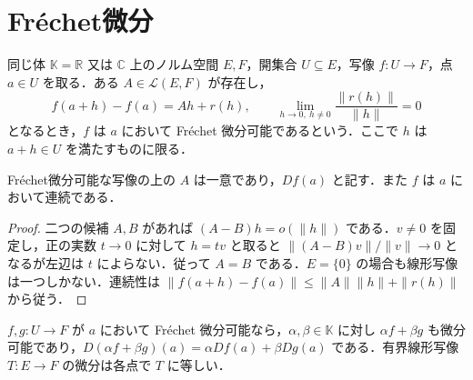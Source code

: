 \section{Fréchet微分}
\begin{defn}[Fréchet微分]
同じ体 $\mathbb K=\mathbb R$ 又は $\mathbb C$ 上のノルム空間 $E,F$，開集合 $U\subseteq E$，写像 $f:U\to F$，点 $a\in U$ を取る．ある $A\in\mathcal L(E,F)$ が存在し，
\[
 f(a+h)-f(a)=Ah+r(h),\qquad \lim_{h\to0,\ h\ne0}\frac{\|r(h)\|}{\|h\|}=0
\]
となるとき，$f$ は $a$ において Fréchet 微分可能であるという．ここで $h$ は $a+h\in U$ を満たすものに限る．
\end{defn}
\begin{prop}[微分の一意性と連続性]
Fréchet微分可能な写像の上の $A$ は一意であり，$Df(a)$ と記す．また $f$ は $a$ において連続である．
\end{prop}
\begin{proof}
二つの候補 $A,B$ があれば $(A-B)h=o(\|h\|)$ である．$v\ne0$ を固定し，正の実数 $t\to0$ に対して $h=tv$ と取ると $\|(A-B)v\|/\|v\|\to0$ となるが左辺は $t$ によらない．従って $A=B$ である．$E=\{0\}$ の場合も線形写像は一つしかない．連続性は $\|f(a+h)-f(a)\|\leq\|A\|\|h\|+\|r(h)\|$ から従う．
\end{proof}
\begin{prop}[微分の線形性]
$f,g:U\to F$ が $a$ において Fréchet 微分可能なら，$\alpha,\beta\in\mathbb K$ に対し $\alpha f+\beta g$ も微分可能であり，$D(\alpha f+\beta g)(a)=\alpha Df(a)+\beta Dg(a)$ である．有界線形写像 $T:E\to F$ の微分は各点で $T$ に等しい．
\end{prop}
